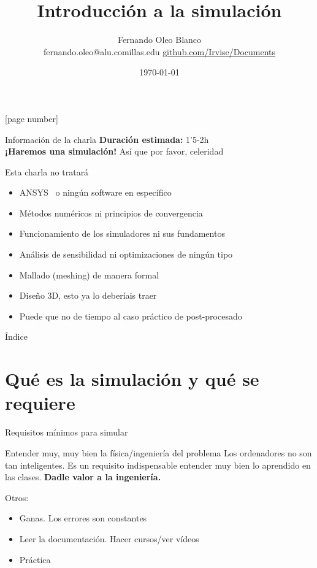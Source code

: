 \documentclass[12pt]{beamer}
\begin{document}
	\author{Fernando Oleo Blanco \\ fernando.oleo@alu.comillas.edu \hfill 	\href{https://github.com/Irvise/Documents}{github.com/Irvise/Documents}}
	\title{Introducción a la simulación}
	\date{\today}
	[page number]
\begin{frame}[plain]
	\maketitle
\end{frame}

\begin{frame}{Información de la charla}
	\textbf{Duración estimada:} 1'5-2h \\
	\textbf{¡Haremos una simulación!} Así que por favor, celeridad
	
	\begin{block}{Esta charla no tratará}
		\begin{itemize}
			\item ANSYS \textregistered\ o ningún software en específico
			\item Métodos numéricos ni principios de convergencia
			\item Funcionamiento de los simuladores ni sus fundamentos
			\item Análisis de sensibilidad ni optimizaciones de ningún tipo
			\item Mallado (meshing) de manera formal
			\item Diseño 3D, esto ya lo deberíais traer
			\item Puede que no de tiempo al caso práctico de post-procesado
		\end{itemize}
	\end{block}
\end{frame}

\begin{frame}{Índice}
	\setcounter{tocdepth}{2}
	\tableofcontents
\end{frame}

\section{Qué es la simulación y qué se requiere}

\begin{frame}{Requisitos mínimos para simular}
	\begin{block}{Entender muy, muy bien la física/ingeniería del problema}
		Los ordenadores no son tan inteligentes. Es un requisito indispensable entender muy bien lo aprendido en las clases. \textbf{Dadle valor a la ingeniería.}
	\end{block}
	Otros:
	\begin{itemize}
		\item Ganas. Los errores son constantes
		\item Leer la documentación. Hacer cursos/ver vídeos
		\item Práctica
	\end{itemize}
\end{frame}
\end{document}
